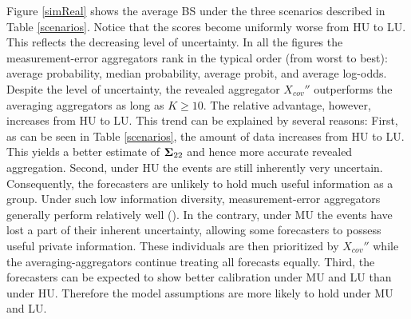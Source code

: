 \documentclass[11pt]{article}
\theoremstyle{definition}
\theoremstyle{definition}
\def\bSigma{{\bf \Sigma}}
\begin{document}
Figure \ref{simReal} shows the average BS under the three scenarios described in Table \ref{scenarios}. Notice that the scores become uniformly worse from HU to LU. This reflects the decreasing level of uncertainty. 
In all the figures the measurement-error aggregators rank in the typical order (from worst to best): average probability, median probability, average probit, and average log-odds. Despite the level of uncertainty, the revealed aggregator $X_{cov}''$ outperforms the averaging aggregators as long as $K \geq 10$. 
The relative advantage, however, increases from HU to LU. This trend can be explained by several reasons: First, as can be seen in Table \ref{scenarios}, the amount of data increases from HU to LU. This yields a better estimate of $\bSigma_{22}$ and hence more accurate revealed aggregation. Second, under HU the events are still inherently very uncertain. Consequently, the forecasters are unlikely to hold much useful information as a group. Under such low information diversity, measurement-error aggregators generally perform relatively well (\citealt{satopaamodeling}).  In the contrary, under MU  the events have lost a part of their inherent uncertainty, allowing some forecasters to possess useful private information. These individuals are then prioritized by $X_{cov}''$ while the averaging-aggregators continue treating all forecasts equally. Third, the forecasters can be expected to show better calibration under MU and LU than under HU. Therefore the model assumptions are more likely to hold under MU and LU. 



\end{document}

